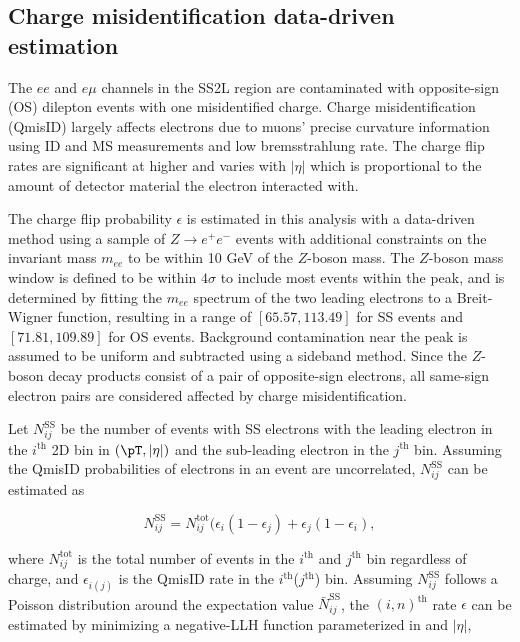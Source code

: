 \documentclass[../thesis.tex]{subfiles}
\begin{document}
\subsection{Charge misidentification data-driven estimation}
\label{sec:qmisid}
The $ee$ and $e\mu$ channels in the \acs{SS2L} region are contaminated with opposite-sign (\acs{OS}) dilepton events with one misidentified charge. Charge misidentification (\acs{QmisID}) largely affects electrons due to muons' precise curvature information using \acs{ID} and \acs{MS} measurements and low bremsstrahlung rate. The charge flip rates are significant at higher \pT and varies with $|\eta|$ which is proportional to the amount of detector material the electron interacted with.

The charge flip probability $\epsilon$ is estimated in this analysis with a data-driven method \citep{EXOT-2016-16} using a sample of $Z\rightarrow e^+e^-$ events with additional constraints on the invariant mass $m_{ee}$ to be within 10 GeV of the $Z$-boson mass. The $Z$-boson mass window is defined to be within $4\sigma$ to include most events within the peak, and is determined by fitting the $m_{ee}$ spectrum of the two leading electrons to a Breit-Wigner function, resulting in a range of $[65.57, 113.49]$ for SS events and $[71.81, 109.89]$ for \acs{OS} events. Background contamination near the peak is assumed to be uniform and subtracted using a sideband method. Since the $Z$-boson decay products consist of a pair of opposite-sign electrons, all same-sign electron pairs are considered affected by charge misidentification.

Let $N_{ij}^\mathrm{SS}$ be the number of events with \acs{SS} electrons with the leading electron in the $i^\mathrm{th}$ 2D bin in $(\pT,|\eta|)$ and the sub-leading electron in the $j^\mathrm{th}$ bin. Assuming the \acs{QmisID} probabilities of electrons in an event are uncorrelated, $N_{ij}^\mathrm{SS}$ can be estimated as

\begin{equation}
N_{ij}^\mathrm{SS} = N_{ij}^\mathrm{tot} (\epsilon_i(1-\epsilon_j) + \epsilon_j(1-\epsilon_i),
\end{equation}

where $N_{ij}^\mathrm{tot}$ is the total number of events in the $i^\mathrm{th}$ and $j^\mathrm{th}$ bin regardless of charge, and $\epsilon_{i(j)}$ is the \acs{QmisID} rate in the $i^\mathrm{th}$($j^\mathrm{th}$) bin. Assuming $N_{ij}^\mathrm{SS}$ follows a Poisson distribution around the expectation value $\bar{N}_{ij}^\mathrm{SS}$, the $(i,n)^\text{th}$ rate $\epsilon$ can be estimated by minimizing a negative-\acs{LLH} function parameterized in \pT and $|\eta|$,
\end{document}
